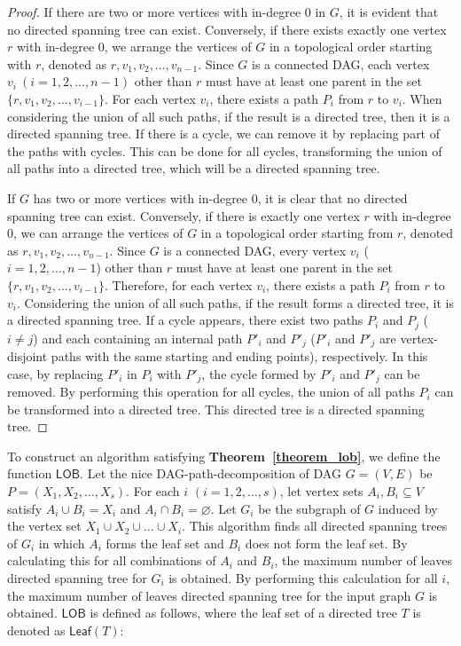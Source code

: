 \documentclass[runningheads]{llncs}
\theoremstyle{plain}
\theoremstyle{definition}
\begin{document}
\begin{proof}
    If there are two or more vertices with in-degree 0 in $G$, it is evident that no directed spanning tree can exist. Conversely, if there exists exactly one vertex $r$ with in-degree 0, we arrange the vertices of $G$ in a topological order starting with $r$, denoted as $r, v_1, v_2, \dots, v_{n-1}$. Since $G$ is a connected DAG, each vertex $v_i\ (i=1, 2, \dots, n-1)$ other than $r$ must have at least one parent in the set $\{r, v_1, v_2, \dots, v_{i-1}\}$. For each vertex $v_i$, there exists a path $P_i$ from $r$ to $v_i$. When considering the union of all such paths, if the result is a directed tree, then it is a directed spanning tree. If there is a cycle, we can remove it by replacing part of the paths with cycles. This can be done for all cycles, transforming the union of all paths into a directed tree, which will be a directed spanning tree.

    If \( G \) has two or more vertices with in-degree 0, it is clear that no directed spanning tree can exist. Conversely, if there is exactly one vertex \( r \) with in-degree 0, we can arrange the vertices of \( G \) in a topological order starting from \( r \), denoted as \( r, v_1, v_2, \dots, v_{n-1} \). Since \( G \) is a connected DAG, every vertex \( v_i \) (\( i = 1, 2, \dots, n-1 \)) other than \( r \) must have at least one parent in the set \( \{ r, v_1, v_2, \dots, v_{i-1} \} \). Therefore, for each vertex \( v_i \), there exists a path \( P_i \) from \( r \) to \( v_i \). Considering the union of all such paths, if the result forms a directed tree, it is a directed spanning tree. If a cycle appears, there exist two paths \( P_i \) and \( P_j \) (\( i \neq j \)) and each containing an internal path $P'_i$ and $P'_j$ (\( P'_i \) and \( P'_j \) are vertex-disjoint paths with the same starting and ending points), respectively. In this case, by replacing \( P'_i \) in \( P_i \) with \( P'_j \), the cycle formed by \( P'_i \) and \( P'_j \) can be removed. By performing this operation for all cycles, the union of all paths \( P_i \) can be transformed into a directed tree. This directed tree is a directed spanning tree.

\end{proof}

To construct an algorithm satisfying \textbf{Theorem~\ref{theorem_lob}}, we define the function $\mathsf{LOB}$. Let the nice DAG-path-decomposition of DAG $G = (V, E)$ be $P = (X_1, X_2, \dots, X_s)$. For each $i$ $(i=1, 2, \dots, s)$, let vertex sets $A_i, B_i \subseteq V$ satisfy $A_i \cup B_i = X_i$ and $A_i \cap B_i = \varnothing$. Let $G_i$ be the subgraph of $G$ induced by the vertex set $X_1 \cup X_2 \cup \dots \cup X_i$.
This algorithm finds all directed spanning trees of $G_i$ in which $A_i$ forms the leaf set and $B_i$ does not form the leaf set. By calculating this for all combinations of $A_i$ and $B_i$, the maximum number of leaves directed spanning tree for $G_i$ is obtained. By performing this calculation for all $i$, the maximum number of leaves directed spanning tree for the input graph $G$ is obtained. $\mathsf{LOB}$ is defined as follows, where the leaf set of a directed tree $T$ is denoted as $\mathsf{Leaf}(T)$:
\end{document}

